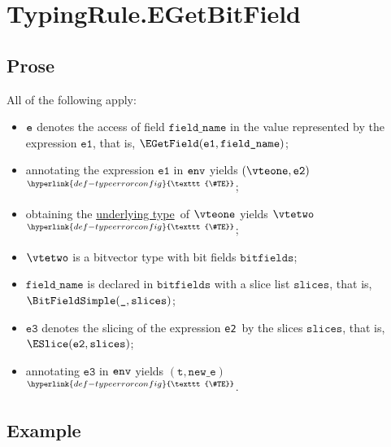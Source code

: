\documentclass{book}
\newcommand\TypeErrorConfig[0]{\hyperlink{def-typeerrorconfig}{\texttt{\#TE}}}
\newcommand\ProseOrTypeError[0]{\hyperlink{def-proseortypeerror}{$^{\TypeErrorConfig}$}}
\newcommand\underlyingtype[0]{\hyperlink{def-underlyingtype}{underlying type}}
\newcommand\vt[0]{\texttt{t}}
\newcommand\veone[0]{\texttt{e1}}
\newcommand\vetwo[0]{\texttt{e2}}
\newcommand\vethree[0]{\texttt{e3}}
\newcommand\bitfields[0]{\texttt{bitfields}}
\newcommand\fieldname[0]{\texttt{field\_name}}
\newcommand\slices[0]{\texttt{slices}}
\newcommand\newe[0]{\texttt{new\_e}}
\begin{document}


\section{TypingRule.EGetBitField \label{sec:TypingRule.EGetBitField}}

\subsection{Prose}
All of the following apply:
\begin{itemize}
  \item $\texttt{e}$ denotes the access of field $\fieldname$ in the value represented by the expression $\veone$, that is, $\EGetField(\veone, \fieldname)$;
  \item annotating the expression $\veone$ in $\texttt{env}$ yields $(\vteone, \vetwo)$ \ProseOrTypeError;
  \item obtaining the \underlyingtype\ of $\vteone$ yields $\vtetwo$ \ProseOrTypeError;
  \item $\vtetwo$ is a bitvector type with bit fields $\bitfields$;
  \item $\fieldname$ is declared in $\bitfields$ with a slice list $\slices$, that is, \\ $\BitFieldSimple(\Ignore, \slices)$;
  \item $\vethree$ denotes the slicing of the expression \vetwo\ by the slices $\slices$, that is, \\ $\ESlice(\vetwo, \slices)$;
  \item annotating $\vethree$ in $\texttt{env}$ yields $(\vt, \newe)$ \ProseOrTypeError.
\end{itemize}

\subsection{Example}

\end{document}
